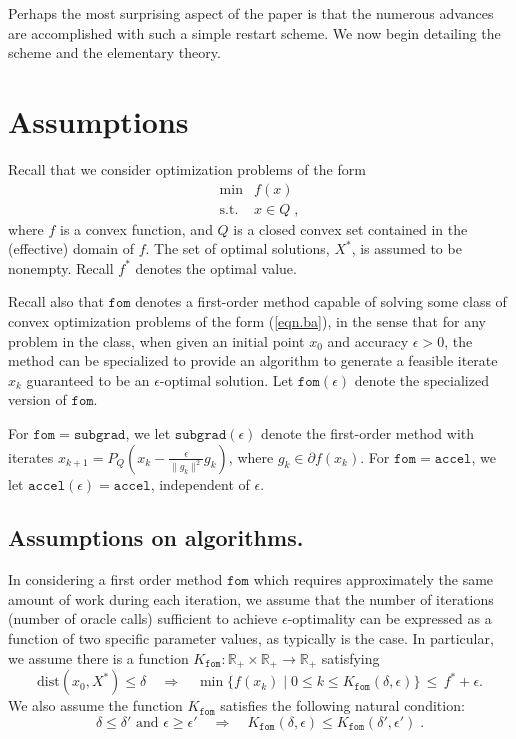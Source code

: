 \documentclass[reqno, 11pt]{amsart}
\numberwithin{equation}{section}
\newcommand{\fom}{\mathtt{fom}}
\newcommand{\subgrad}{\mathtt{subgrad}}
\newcommand{\accel}{\mathtt{accel}}
\newcommand{\dist}{\mathrm{dist}}
\begin{document}
Perhaps the most surprising aspect of the paper is that the numerous advances are accomplished with such a simple restart scheme. We now begin detailing the scheme and the elementary theory.

\section{{\bf Assumptions}}  \label{sect.b}

Recall that we consider optimization problems of the form
\begin{equation}  \label{eqn.ba} 
\begin{array}{rl}
 \min & f(x) \\
\textrm{s.t.} & x \in Q \; , 
\end{array} \end{equation}
where $ f $ is a convex function, and $ Q $ is a closed convex set contained in the (effective) domain of $ f $. The set of optimal solutions, $ X^* $, is assumed to be nonempty. Recall $ f^* $ denotes the optimal value.

Recall also that $ \fom $ denotes a first-order method capable of solving some class of convex optimization problems of the form (\ref{eqn.ba}), in the sense that for any problem in the class, when given an initial point $ x_0 $ and accuracy $ \epsilon  > 0 $, the method can be specialized to provide an algorithm to generate a feasible iterate $ x_k $ guaranteed to be an $ \epsilon $-optimal solution. Let $ \fom(\epsilon) $ denote the specialized version of $ \fom $. 

For $ \fom = \subgrad $, we let $ \subgrad( \epsilon) $ denote the first-order method with iterates $ x_{k+1} = P_Q( x_k - \frac{\epsilon}{\| g_k \|^2} g_k ) $, where $ g_k \in \partial f(x_k) $. For $ \fom = \accel $, we let $ \accel( \epsilon) = \accel $, independent of $ \epsilon $. 

\subsection{Assumptions on algorithms.} \label{sect.ba}
In considering a first order method $ \fom $ which requires approximately the same amount of work during each iteration, we assume that the number of iterations (number of oracle calls) sufficient to achieve $ \epsilon $-optimality can be expressed as a function of two specific parameter values, as typically is the case. In particular, we assume there is a function $ K_{\fom}: \mathbb{R}_+ \times \mathbb{R}_+ \rightarrow \mathbb{R}_+ $ satisfying
\begin{equation} \label{eqn.bb} 
  \dist(x_0, X^*) \leq \delta \quad \Rightarrow \quad  \min \{ f(x_k) \mid 0 \leq k \leq K_{\fom}(\delta , \epsilon) \} \, \leq \, f^* + \epsilon.
   \end{equation}  
We also assume the function $ K_{\fom} $ satisfies the following natural condition:
\begin{equation}  \label{eqn.bc}
    \delta \leq \delta' \textrm{ and } \epsilon \geq \epsilon' \quad \Rightarrow \quad K_{\fom}(\delta, \epsilon ) \leq K_{\fom}(\delta', \epsilon') \; . 
    \end{equation}
   
\end{document}
